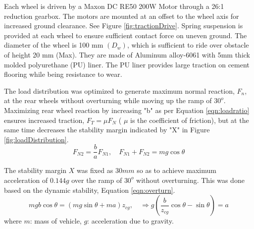    Each wheel is driven by a  Maxon DC RE50 200W Motor through a 26:1 reduction gearbox. The motors are mounted at an offset to the wheel axis for increased ground clearance. See Figure \ref{fig:tractionDrive}. Spring suspension is provided at each wheel to ensure sufficient contact force on uneven  ground. The diameter of the wheel is 100 mm $(D_w)$, which is sufficient to ride over obstacle of height 20 mm (Max). They are made of Aluminum alloy-6061 with 5mm thick molded polyurethane (PU) liner. The PU liner provides large traction on cement flooring while being resistance to wear.

  The load distribution was optimized to generate maximum normal reaction, $F_n$,  at the rear wheels without overturning while moving up the ramp of $30^o$. Maximizing rear wheel reaction by increasing  "b" as per Equation \ref{eqn:loadratio} ensures increased traction, $F_T=\mu F_N$ ( $\mu$ is the coefficient of friction), but at the same time decreases the stability margin indicated by "X" in Figure \ref{fig:loadDistribution}. 
\begin{equation}
\label{eqn:loadratio}
F_{N2}=\frac{b}{a}F_{N1}, \quad F_{N1}+F_{N2}=mg\cos\theta
\end{equation}

The stability margin $X$ was fixed as $30mm$ so as to achieve  maximum acceleration of $0.144g$  over the ramp of $30^o$ without overturning. This was done based on the  dynamic stability, Equation \ref{eqn:overturn}. 
\begin{equation}
\label{eqn:overturn}
mgb\cos\theta=(mg\sin\theta+ma)z_{cg}, \quad \Rightarrow g(\frac{b}{z_{cg}}\cos\theta-\sin\theta)=a
\end{equation}
where $m$: mass of vehicle, $g$: acceleration due to gravity. 
 
